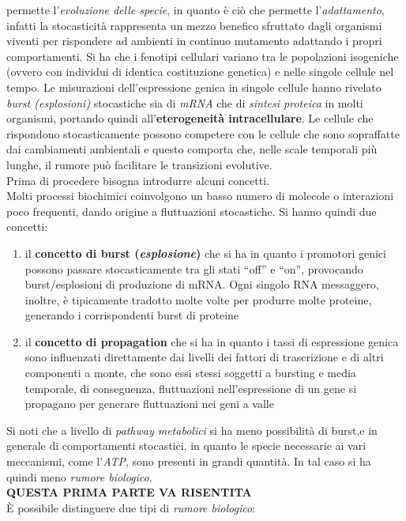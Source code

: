 \documentclass[a4paper,12pt, oneside]{book}
\begin{document}
permette l'\textit{evoluzione delle specie}, in quanto è ciò che permette
l'\textit{adattamento}, infatti la stocasticità rappresenta un mezzo benefico
sfruttato dagli organismi viventi per rispondere ad ambienti in continuo
mutamento adattando i propri comportamenti. Si ha che i fenotipi cellulari
variano tra le 
popolazioni isogeniche (ovvero con individui di identica costituzione genetica)
e nelle singole cellule nel tempo. Le misurazioni dell'espressione genica in
singole cellule hanno rivelato \textit{burst (esplosioni)} stocastiche sia di
\textit{mRNA} che di \textit{sintesi proteica} in molti organismi, portando
quindi all'\textbf{eterogeneità intracellulare}. Le cellule che rispondono
stocasticamente possono competere con le cellule che sono sopraffatte dai
cambiamenti ambientali e questo comporta che, nelle scale temporali più lunghe,
il rumore può facilitare le transizioni evolutive. \\
Prima di procedere bisogna introdurre alcuni concetti. \\
Molti processi biochimici coinvolgono un basso numero di molecole o interazioni
poco frequenti, dando origine a fluttuazioni stocastiche. Si hanno quindi due
concetti:
\begin{enumerate}
  \item il \textbf{concetto di burst (\textit{esplosione})} che si ha in quanto
  i promotori genici possono passare stocasticamente tra gli stati ``off'' e
  ``on'', provocando burst/esplosioni di produzione di mRNA. Ogni singolo RNA
  messaggero, inoltre, è tipicamente tradotto molte volte per produrre molte
  proteine, generando i corrispondenti burst di proteine
  \item il \textbf{concetto di propagation} che si ha in quanto i tassi di
  espressione genica sono influenzati direttamente dai livelli dei fattori di
  trascrizione e di altri componenti a monte, che sono essi stessi soggetti a
  bursting e media temporale, di conseguenza, fluttuazioni nell'espressione di
  un gene si propagano per generare fluttuazioni nei geni a valle 
\end{enumerate}
Si noti che a livello di \textit{pathway metabolici} si ha meno possibilità di
burst,e in generale di comportamenti stocastici, in quanto le specie necessarie
ai vari meccanismi, come l'\textit{ATP}, sono presenti in grandi quantità. In
tal caso si ha quindi meno \textit{rumore biologico}.\\
\textbf{QUESTA PRIMA PARTE VA RISENTITA}\\
È possibile distinguere due tipi di \textit{rumore biologico}:
\end{document}
